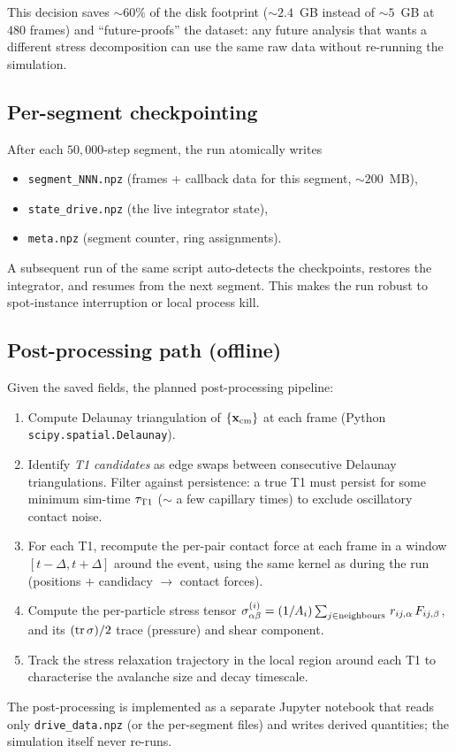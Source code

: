 \documentclass[aps,pre,twocolumn,floatfix,longbibliography]{revtex4-2}
\begin{document}
This decision saves $\sim 60\%$ of the disk footprint
(${\sim} 2.4$~GB instead of ${\sim} 5$~GB at $480$ frames) and
``future-proofs'' the dataset: any future analysis that wants a
different stress decomposition can use the same raw data without
re-running the simulation.

\subsection{Per-segment checkpointing}
After each $50{,}000$-step segment, the run atomically writes
\begin{itemize}
\item \texttt{segment\_NNN.npz} (frames + callback data for this
      segment, ${\sim} 200$~MB),
\item \texttt{state\_drive.npz} (the live integrator state),
\item \texttt{meta.npz} (segment counter, ring assignments).
\end{itemize}
A subsequent run of the same script auto-detects the checkpoints,
restores the integrator, and resumes from the next segment.  This
makes the run robust to spot-instance interruption or local
process kill.

\subsection{Post-processing path (offline)}
Given the saved fields, the planned post-processing pipeline:
\begin{enumerate}
\item Compute Delaunay triangulation of $\{\mathbf x_{\rm cm}\}$ at
      each frame (Python \texttt{scipy.spatial.Delaunay}).
\item Identify \emph{T1 candidates} as edge swaps between consecutive
      Delaunay triangulations.  Filter against persistence: a true
      T1 must persist for some minimum sim-time $\tau_{\rm T1}$
      ($\sim$ a few capillary times) to exclude oscillatory contact
      noise.
\item For each T1, recompute the per-pair contact force at each
      frame in a window $[t - \Delta, t + \Delta]$ around the event,
      using the same kernel as during the run (positions $+$
      candidacy $\to$ contact forces).
\item Compute the per-particle stress tensor
      $\sigma_{\alpha\beta}^{(i)} = (1/A_i) \sum_{j \in {\rm
      neighbours}} \, r_{ij,\alpha} \, F_{ij,\beta}$, and its
      $({\rm tr}\,\sigma)/2$ trace (pressure) and shear component.
\item Track the stress relaxation trajectory in the local region
      around each T1 to characterise the avalanche size and decay
      timescale.
\end{enumerate}
The post-processing is implemented as a separate Jupyter notebook
that reads only \texttt{drive\_data.npz} (or the per-segment files)
and writes derived quantities; the simulation itself never re-runs.
\end{document}
